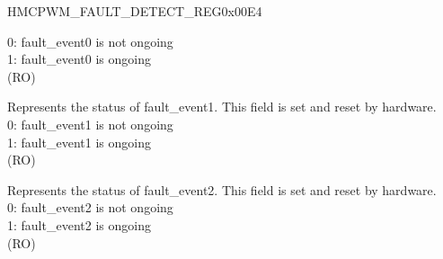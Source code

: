 \begin{register}{H}{MCPWM\_FAULT\_DETECT\_REG}{0x00E4}
\begin{regdesc}
\begin{reglist}
0: fault\_event0 is not ongoing\\
1: fault\_event0 is ongoing\\
(RO)
\label{fielddesc:MCPWMEVENTF1}\item [MCPWM\_EVENT\_F1] Represents the status of fault\_event1. This field is set and reset by hardware.\\
0: fault\_event1 is not ongoing\\
1: fault\_event1 is ongoing\\
(RO)
\label{fielddesc:MCPWMEVENTF2}\item [MCPWM\_EVENT\_F2] Represents the status of fault\_event2. This field is set and reset by hardware.\\
0: fault\_event2 is not ongoing\\
1: fault\_event2 is ongoing\\
(RO)
\end{reglist}\end{regdesc}
\end{register}


